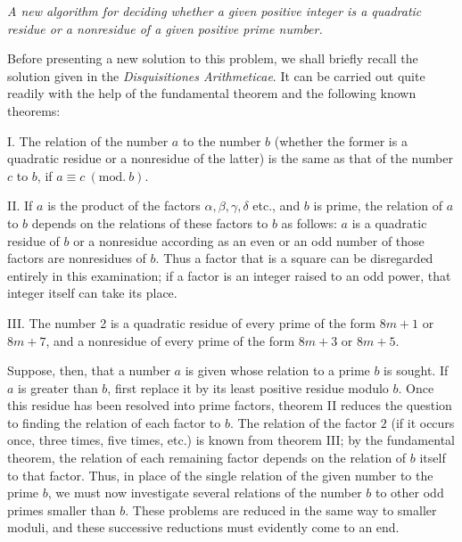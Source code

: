 \begin{center}\textit{A new algorithm for deciding whether a given positive integer is a quadratic residue or a nonresidue of a given positive prime number.}\end{center}


Before presenting a new solution to this problem, we shall briefly recall the solution given in the \textit{Disquisitiones Arithmeticae}. It can be carried out quite readily with the help of the fundamental theorem and the following known theorems:

I. The relation of the number $a$ to the number $b$ (whether the former is a quadratic residue or a nonresidue of the latter) is the same as that of the number $c$ to $b$, if $a\equiv c\ (\mathrm{mod.}\ b)$.

II. If $a$ is the product of the factors $\alpha,\beta,\gamma,\delta$ etc., and $b$ is prime, the relation of $a$ to $b$ depends on the relations of these factors to $b$ as follows: $a$ is a quadratic residue of $b$ or a nonresidue according as an even or an odd number of those factors are nonresidues of $b$. Thus a factor that is a square can be disregarded entirely in this examination; if a factor is an integer raised to an odd power, that integer itself can take its place.

III. The number 2 is a quadratic residue of every prime of the form $8m+1$ or $8m+7$, and a nonresidue of every prime of the form $8m+3$ or $8m+5$.

%
Suppose, then, that a number $a$ is given whose relation to a prime $b$ is sought. If $a$ is greater than $b$, first replace it by its least positive residue modulo $b$. Once this residue has been resolved into prime factors, theorem II reduces the question to finding the relation of each factor to $b$. The relation of the factor $2$ (if it occurs once, three times, five times, etc.) is known from theorem III; by the fundamental theorem, the relation of each remaining factor depends on the relation of $b$ itself to that factor. Thus, in place of the single relation of the given number to the prime $b$, we must now investigate several relations of the number $b$ to other odd primes smaller than $b$. These problems are reduced in the same way to smaller moduli, and these successive reductions must evidently come to an end.


